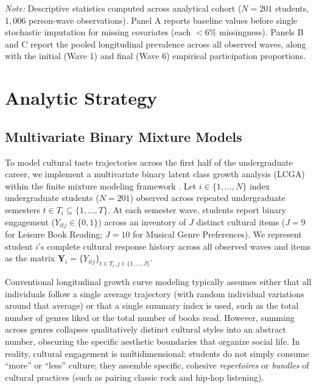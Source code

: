 \documentclass[12pt]{article}
\begin{document}
\begin{table}[htbp]
\begin{tabular*}{\linewidth}{@{\extracolsep{\fill}}llcc@{}}
\bottomrule
\end{tabular*}
\begin{minipage}{\linewidth}
\vspace{4pt}
\footnotesize
\textit{Note:} Descriptive statistics computed across analytical cohort ($N = 201$ students, $1,006$ person-wave observations). Panel A reports baseline values before single stochastic imputation for missing covariates (each $< 6\%$ missingness). Panels B and C report the pooled longitudinal prevalence across all observed waves, along with the initial (Wave 1) and final (Wave 6) empirical participation proportions.
\end{minipage}
\end{table}

\section{Analytic Strategy}\label{sec:methods}

\subsection{Multivariate Binary Mixture Models}

To model cultural taste trajectories across the first half of the undergraduate career, we implement a multivariate binary latent class growth analysis (LCGA) within the finite mixture modeling framework \citep{grun2008flexmix}. Let $i \in \{1, \dots, N\}$ index undergraduate students ($N = 201$) observed across repeated undergraduate semesters $t \in T_i \subseteq \{1, \dots, T\}$. At each semester wave, students report binary engagement ($Y_{itj} \in \{0, 1\}$) across an inventory of $J$ distinct cultural items ($J = 9$ for Leisure Book Reading; $J = 10$ for Musical Genre Preferences). We represent student $i$'s complete cultural response history across all observed waves and items as the matrix $\mathbf{Y}_i = \{Y_{itj}\}_{t \in T_i, j \in \{1, \dots, J\}}$.

Conventional longitudinal growth curve modeling typically assumes either that all individuals follow a single average trajectory (with random individual variations around that average) or that a single summary index is used, such as the total number of genres liked or the total number of books read. However, summing across genres collapses qualitatively distinct cultural styles into an abstract number, obscuring the specific aesthetic boundaries that organize social life. In reality, cultural engagement is multidimensional: students do not simply consume ``more'' or ``less'' culture; they assemble specific, cohesive \textit{repertoires} or \textit{bundles} of cultural practices (such as pairing classic rock and hip-hop listening).
\end{document}
